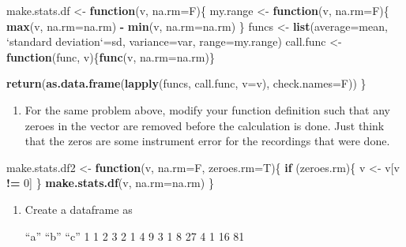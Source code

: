 \documentclass[]{article}
\newenvironment{Shaded}{\begin{snugshade}}{\end{snugshade}}
\newcommand{\ControlFlowTok}[1]{\textcolor[rgb]{0.13,0.29,0.53}{\textbf{#1}}}
\newcommand{\DataTypeTok}[1]{\textcolor[rgb]{0.13,0.29,0.53}{#1}}
\newcommand{\DecValTok}[1]{\textcolor[rgb]{0.00,0.00,0.81}{#1}}
\newcommand{\KeywordTok}[1]{\textcolor[rgb]{0.13,0.29,0.53}{\textbf{#1}}}
\newcommand{\NormalTok}[1]{#1}
\newcommand{\OperatorTok}[1]{\textcolor[rgb]{0.81,0.36,0.00}{\textbf{#1}}}
\newcommand{\StringTok}[1]{\textcolor[rgb]{0.31,0.60,0.02}{#1}}
\providecommand{\tightlist}{%
  \setlength{\itemsep}{0pt}\setlength{\parskip}{0pt}}
\begin{document}
\begin{Shaded}
\begin{Highlighting}[]
\NormalTok{make.stats.df <-}\StringTok{ }\ControlFlowTok{function}\NormalTok{(v, }\DataTypeTok{na.rm=}\NormalTok{F)\{}
\NormalTok{  my.range <-}\StringTok{ }\ControlFlowTok{function}\NormalTok{(v, }\DataTypeTok{na.rm=}\NormalTok{F)\{}
    \KeywordTok{max}\NormalTok{(v, }\DataTypeTok{na.rm=}\NormalTok{na.rm) }\OperatorTok{-}\StringTok{ }\KeywordTok{min}\NormalTok{(v, }\DataTypeTok{na.rm=}\NormalTok{na.rm)}
\NormalTok{  \}}
\NormalTok{  funcs <-}\StringTok{ }\KeywordTok{list}\NormalTok{(}\DataTypeTok{average=}\NormalTok{mean, }\StringTok{`}\DataTypeTok{standard deviation}\StringTok{`}\NormalTok{=sd, }
                \DataTypeTok{variance=}\NormalTok{var, }\DataTypeTok{range=}\NormalTok{my.range)}
\NormalTok{  call.func <-}\StringTok{ }\ControlFlowTok{function}\NormalTok{(func, v)\{}\KeywordTok{func}\NormalTok{(v, }\DataTypeTok{na.rm=}\NormalTok{na.rm)\}}
  
  \KeywordTok{return}\NormalTok{(}\KeywordTok{as.data.frame}\NormalTok{(}\KeywordTok{lapply}\NormalTok{(funcs, call.func, }\DataTypeTok{v=}\NormalTok{v), }\DataTypeTok{check.names=}\NormalTok{F))}
\NormalTok{\}}
\end{Highlighting}
\end{Shaded}

\begin{enumerate}
\def\labelenumi{\arabic{enumi}.}
\setcounter{enumi}{5}
\tightlist
\item
  For the same problem above, modify your function definition such that
  any zeroes in the vector are removed before the calculation is done.
  Just think that the zeros are some instrument error for the recordings
  that were done.
\end{enumerate}

\begin{Shaded}
\begin{Highlighting}[]
\NormalTok{make.stats.df2 <-}\StringTok{ }\ControlFlowTok{function}\NormalTok{(v, }\DataTypeTok{na.rm=}\NormalTok{F, }\DataTypeTok{zeroes.rm=}\NormalTok{T)\{}
  \ControlFlowTok{if}\NormalTok{ (zeroes.rm)\{}
\NormalTok{    v <-}\StringTok{ }\NormalTok{v[v }\OperatorTok{!=}\StringTok{ }\DecValTok{0}\NormalTok{]}
\NormalTok{  \}}
  \KeywordTok{make.stats.df}\NormalTok{(v, }\DataTypeTok{na.rm=}\NormalTok{na.rm)}
\NormalTok{\}}
\end{Highlighting}
\end{Shaded}

\begin{enumerate}
\def\labelenumi{\arabic{enumi}.}
\setcounter{enumi}{6}
\item
  Create a dataframe as

  ``a'' ``b'' ``c'' 1 1 2 3 2 1 4 9 3 1 8 27 4 1 16 81 
\end{enumerate}
\end{document}
